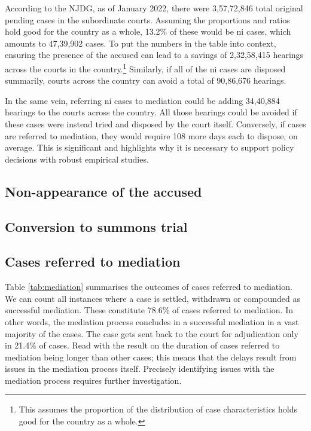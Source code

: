 According to the NJDG, as of January 2022, there were 3,57,72,846 total original pending cases in the subordinate courts. Assuming the proportions and ratios hold good for the country as a whole, 13.2\% of these would be \gls{ni} cases, which amounts to 47,39,902 cases. To put the numbers in the table into context, ensuring the presence of the accused can lead to a savings of 2,32,58,415 hearings across the courts in the country.\footnote{This assumes the proportion of the distribution of case characteristics holds good for the country as a whole.} Similarly, if all of the \gls{ni} cases are disposed summarily, courts across the country can avoid a total of 90,86,676 hearings.

In the same vein, referring \gls{ni} cases to mediation could be adding 34,40,884 hearings to the courts across the country. All those hearings could be avoided if these cases were instead tried and disposed by the court itself. Conversely, if cases are referred to mediation, they would require 108 more days each to dispose, on average. This is significant and highlights why it is necessary to support policy decisions with robust empirical studies.

\subsection{Non-appearance of the accused}
\subsection{Conversion to summons trial}

\subsection{Cases referred to mediation} \label{sec:furth-exam-cases}

Table \ref{tab:mediation} summarises the outcomes of cases referred to mediation. We can count all instances where a case is settled, withdrawn or compounded as successful mediation. These constitute 78.6\% of cases referred to mediation. In other words, the mediation process concludes in a successful mediation in a vast majority of the cases. The case gets sent back to the court for adjudication only in 21.4\% of cases. Read with the result on the duration of cases referred to mediation being longer than other cases; this means that the delays result from issues in the mediation process itself. Precisely identifying issues with the mediation process requires further investigation.


